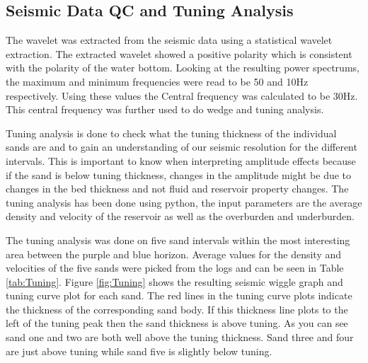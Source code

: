 \documentclass[fleqn]{article}
\begin{document}
\subsection{Seismic Data QC and Tuning Analysis}

The wavelet was extracted from the seismic data using a statistical wavelet extraction. The extracted wavelet showed a positive polarity which is consistent with the polarity of the water bottom. Looking at the resulting power spectrums, the maximum and minimum frequencies were read to be 50 and 10Hz respectively. Using these values the Central frequency was calculated to be 30Hz. This central frequency was further used to do wedge and tuning analysis. 

Tuning analysis is done to check what the tuning thickness of the individual sands are and to gain an understanding of our seismic resolution for the different intervals. This is important to know when interpreting amplitude effects because if the sand is below tuning thickness, changes in the amplitude might be due to changes in the bed thickness and not fluid and reservoir property changes. The tuning analysis has been done using python, the input parameters are the average density and velocity of the reservoir as well as the overburden and underburden.

The tuning analysis was done on five sand intervals within the most interesting area between the purple and blue horizon. Average values for the density and velocities of the five sands were picked from the logs and can be seen in Table \ref{tab:Tuning}. Figure \ref{fig:Tuning} shows the resulting seismic wiggle graph and tuning curve plot for each sand. The red lines in the tuning curve plots indicate the thickness of the corresponding sand body. If this thickness line plots to the left of the tuning peak then the sand thickness is above tuning. As you can see sand one and two are both well above the tuning thickness. Sand three and four are just above tuning while sand five is slightly below tuning. 
\end{document}
